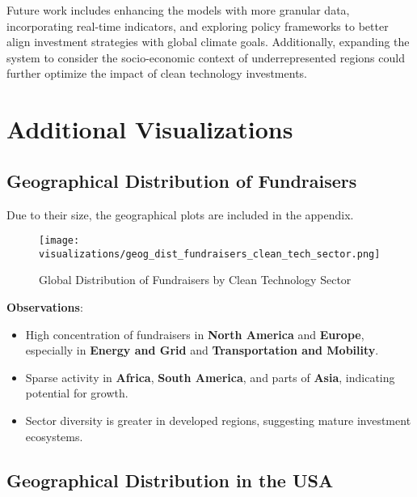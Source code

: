 \documentclass[sigconf]{acmart}
\begin{document}
Future work includes enhancing the models with more granular data, incorporating real-time indicators, and exploring policy frameworks to better align investment strategies with global climate goals. Additionally, expanding the system to consider the socio-economic context of underrepresented regions could further optimize the impact of clean technology investments.




\appendix

\section{Additional Visualizations}

\subsection{Geographical Distribution of Fundraisers}

Due to their size, the geographical plots are included in the appendix.

\begin{figure*}[htpb]
    \centering
    \texttt{[image: visualizations/geog\_dist\_fundraisers\_clean\_tech\_sector.png]}
    \caption{Global Distribution of Fundraisers by Clean Technology Sector}
    \label{fig:global_distribution}
\end{figure*}

\textbf{Observations}:

\begin{itemize}
    \item High concentration of fundraisers in \textbf{North America} and \textbf{Europe}, especially in \textbf{Energy and Grid} and \textbf{Transportation and Mobility}.
    \item Sparse activity in \textbf{Africa}, \textbf{South America}, and parts of \textbf{Asia}, indicating potential for growth.
    \item Sector diversity is greater in developed regions, suggesting mature investment ecosystems.
\end{itemize}

\subsection{Geographical Distribution in the USA}
\end{document}

